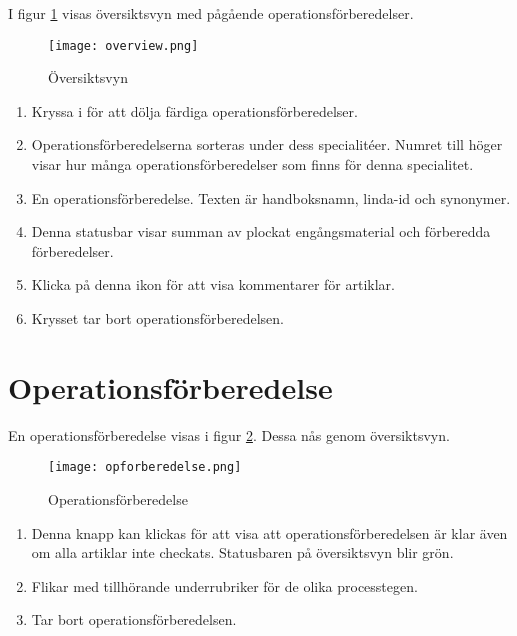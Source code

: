 \documentclass[12pt]{amsart}
\begin{document}
I figur \ref{fig:overview} visas översiktsvyn med pågående operationsförberedelser.

 \begin{figure}[H]
	\begin{center}
	\texttt{[image: overview.png]}
	\caption{Översiktsvyn}
	\label{fig:overview}
	\end{center}
\end{figure}

\begin{enumerate}
\item Kryssa i för att dölja färdiga operationsförberedelser.
\item Operationsförberedelserna sorteras under dess specialitéer. Numret till höger visar hur många operationsförberedelser som finns för denna specialitet.
\item En operationsförberedelse. Texten är handboksnamn, linda-id och synonymer. 
\item Denna statusbar visar summan av plockat engångsmaterial och förberedda förberedelser.
\item Klicka på denna ikon för att visa kommentarer för artiklar.
\item Krysset tar bort operationsförberedelsen.

\end{enumerate}

\section{Operationsförberedelse}
En operationsförberedelse visas i figur \ref{fig:opforberedelse}. Dessa nås genom översiktsvyn. 

\begin{figure}[H]
	\begin{center}
	\texttt{[image: opforberedelse.png]}
	\caption{Operationsförberedelse}
	\label{fig:opforberedelse}
	\end{center}
\end{figure}

\begin{enumerate}
\item Denna knapp kan klickas för att visa att operationsförberedelsen är klar även om alla artiklar inte checkats. Statusbaren på översiktsvyn blir grön.
\item Flikar med tillhörande underrubriker för de olika processtegen.
\item Tar bort operationsförberedelsen.
\end{enumerate}
\end{document}
